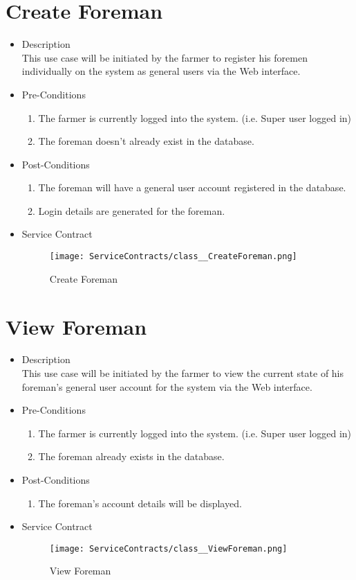 \documentclass[11pt,fleqn]{book} %
\begin{document}
\section{Create Foreman}
\begin{itemize}
	\item Description\\
	This use case will be initiated by the farmer to register his foremen individually on the system as general users via the Web interface.
	\item Pre-Conditions
	\begin{enumerate}
		\item The farmer is currently logged into the system. (i.e. Super user logged in)
		\item The foreman doesn’t already exist in the database.
	\end{enumerate}
	\item Post-Conditions
	\begin{enumerate}
		\item The foreman will have a general user account registered in the database.
		\item Login details are generated for the foreman.				
	\end{enumerate}
	\item Service Contract
	\begin{figure}
		\texttt{[image: ServiceContracts/class\_\_CreateForeman.png]}
		\caption{Create Foreman}
	\end{figure}
\end{itemize}

\section{View Foreman}
\begin{itemize}
	\item Description\\
	This use case will be initiated by the farmer to view the current state of his foreman’s general user account for the system via the Web interface.
	\item Pre-Conditions
	\begin{enumerate}
		\item The farmer is currently logged into the system. (i.e. Super user logged in)
		\item The foreman already exists in the database.					
	\end{enumerate}
	\item Post-Conditions
	\begin{enumerate}
		\item The foreman’s account details will be displayed.
	\end{enumerate}
	\item Service Contract
	\begin{figure}
		\texttt{[image: ServiceContracts/class\_\_ViewForeman.png]}
		\caption{View Foreman}
	\end{figure}
\end{itemize}
\end{document}
